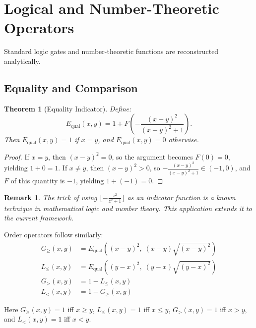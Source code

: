 \documentclass[12pt, a4paper]{article}
\theoremstyle{note}
\newtheorem{theorem}{Theorem}[section]
\newtheorem{remark}{Remark}[section]
\begin{document}
\section{Logical and Number-Theoretic Operators}
\label{sec:logic}

Standard logic gates and number-theoretic functions are reconstructed analytically.

\subsection{Equality and Comparison}

\begin{theorem}[Equality Indicator]\label{thm:equality}
Define:
\[
E_{\operatorname{qual}}(x, y) = 1 + F\!\left(-\frac{(x-y)^2}{(x-y)^2 + 1}\right).
\]
Then $E_{\operatorname{qual}}(x, y) = 1$ if $x = y$, and $E_{\operatorname{qual}}(x, y) = 0$ otherwise.
\end{theorem}

\begin{proof}
If $x = y$, then $(x-y)^2 = 0$, so the argument becomes $F(0) = 0$, yielding $1 + 0 = 1$. If $x \neq y$, then $(x-y)^2 > 0$, so $-\frac{(x-y)^2}{(x-y)^2 + 1} \in (-1, 0)$, and $F$ of this quantity is $-1$, yielding $1 + (-1) = 0$.
\end{proof}

\begin{remark}
The trick of using $\lfloor -\frac{z^2}{z^2+1} \rfloor$ as an indicator function is a known technique in mathematical logic and number theory. This application extends it to the current framework.
\end{remark}

Order operators follow similarly:
\begin{align*}
G_{\geq}(x, y) &= E_{\operatorname{qual}}\!\left((x-y)^2, \; (x-y)\sqrt{(x-y)^2}\right) \\
L_{\leq}(x, y) &= E_{\operatorname{qual}}\!\left((y-x)^2, \; (y-x)\sqrt{(y-x)^2}\right) \\
G_{>}(x, y) &= 1 - L_{\leq}(x, y) \\
L_{<}(x, y) &= 1 - G_{\geq}(x, y)
\end{align*}

Here $G_{\geq}(x,y) = 1$ iff $x \geq y$, $L_{\leq}(x,y) = 1$ iff $x \leq y$, $G_{>}(x,y) = 1$ iff $x > y$, and $L_{<}(x,y) = 1$ iff $x < y$.
\end{document}
